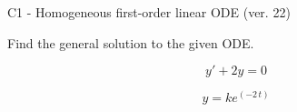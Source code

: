\begin{exercise}
  \begin{exerciseTitle}C1 - Homogeneous first-order linear ODE (ver. 22)\end{exerciseTitle}
  \begin{exerciseStatement}
    
Find the general solution to the given ODE.

    
\[y'+2y=0\]

  \end{exerciseStatement}
  \begin{exerciseAnswer}
    
\[y= k e^{\left(-2 \, t\right)}\]

  \end{exerciseAnswer}
\end{exercise}
